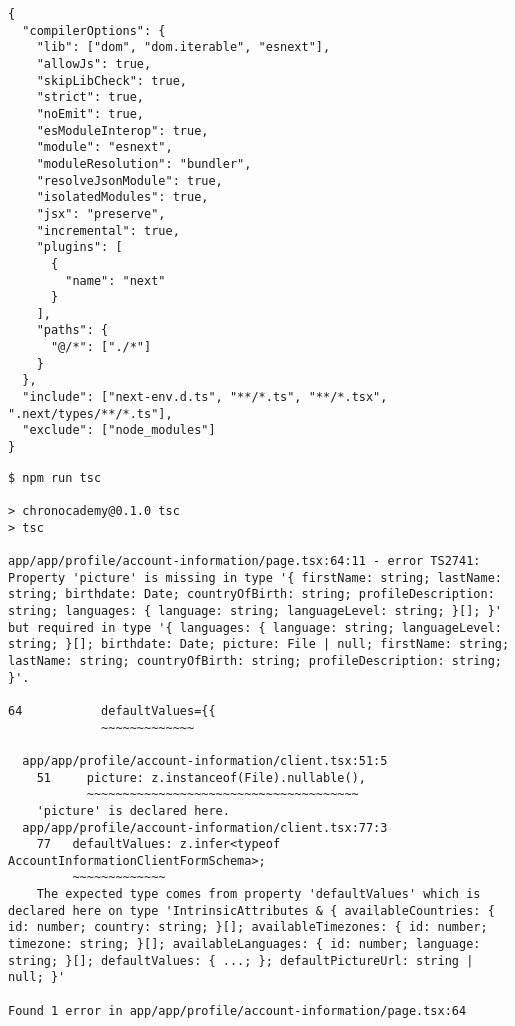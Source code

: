 \begin{verbatim}
{
  "compilerOptions": {
    "lib": ["dom", "dom.iterable", "esnext"],
    "allowJs": true,
    "skipLibCheck": true,
    "strict": true,
    "noEmit": true,
    "esModuleInterop": true,
    "module": "esnext",
    "moduleResolution": "bundler",
    "resolveJsonModule": true,
    "isolatedModules": true,
    "jsx": "preserve",
    "incremental": true,
    "plugins": [
      {
        "name": "next"
      }
    ],
    "paths": {
      "@/*": ["./*"]
    }
  },
  "include": ["next-env.d.ts", "**/*.ts", "**/*.tsx", ".next/types/**/*.ts"],
  "exclude": ["node_modules"]
}
\end{verbatim}

\begin{verbatim}
$ npm run tsc

> chronocademy@0.1.0 tsc
> tsc

app/app/profile/account-information/page.tsx:64:11 - error TS2741: Property 'picture' is missing in type '{ firstName: string; lastName: string; birthdate: Date; countryOfBirth: string; profileDescription: string; languages: { language: string; languageLevel: string; }[]; }' but required in type '{ languages: { language: string; languageLevel: string; }[]; birthdate: Date; picture: File | null; firstName: string; lastName: string; countryOfBirth: string; profileDescription: string; }'.

64           defaultValues={{
             ~~~~~~~~~~~~~

  app/app/profile/account-information/client.tsx:51:5
    51     picture: z.instanceof(File).nullable(),
           ~~~~~~~~~~~~~~~~~~~~~~~~~~~~~~~~~~~~~~
    'picture' is declared here.
  app/app/profile/account-information/client.tsx:77:3
    77   defaultValues: z.infer<typeof AccountInformationClientFormSchema>;
         ~~~~~~~~~~~~~
    The expected type comes from property 'defaultValues' which is declared here on type 'IntrinsicAttributes & { availableCountries: { id: number; country: string; }[]; availableTimezones: { id: number; timezone: string; }[]; availableLanguages: { id: number; language: string; }[]; defaultValues: { ...; }; defaultPictureUrl: string | null; }'

Found 1 error in app/app/profile/account-information/page.tsx:64
\end{verbatim}
